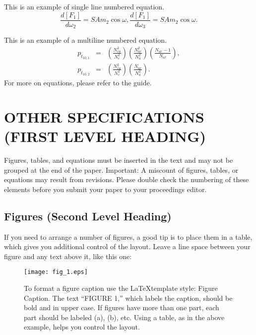 \documentclass{aip-cp}
\begin{document}
\noindent This is an example of single line numbered equation.
\begin{equation}
\frac{d[F_1]}{d\omega_2} = SAm_2\cos\omega,\frac{d[F_1]}{d\omega_3}= SAm_2\cos\omega.
\end{equation}

This is an example of a multiline numbered equation.
\begin{eqnarray}
p_{t_{10,1}}&=&\left(\frac{N_{cu}^2}{ N_c ^2}\right)\left(\frac{N_{ar}^2}{N_a^2}\right)\left(\frac{N_{ar}-1}{N_{ar}}\right),\\
p_{t_{10,2}}&=&\left(\frac{N_{cu}^2}{ N_c ^2}\right)\left(\frac{N_{ar}}{N_a^2}\right).
\end{eqnarray}
For more on equations, please refer to the guide.

\section{OTHER SPECIFICATIONS (FIRST LEVEL HEADING)}
Figures, tables, and equations must be inserted in the text and may not be grouped at the end of the paper. Important: A miscount of figures, tables, or equations may result from revisions. Please double check the numbering of these elements before you submit your paper to your proceedings editor.

\subsection{Figures (Second Level Heading)}
If you need to arrange a number of figures, a good tip is to place them in a table, which gives you additional control of the layout. Leave a line space between your figure and any text above it, like this one:

\begin{figure}[h]
  \centerline{\texttt{[image: fig\_1.eps]}}
  \caption{To format a figure caption use the \LaTeX template style: Figure Caption. The text ``FIGURE 1,'' which labels the caption, should be bold and in upper case. If figures have more than one part, each part should be labeled (a), (b), etc. Using a table, as in the above example, helps you control the layout.}
\end{figure}
\end{document}
